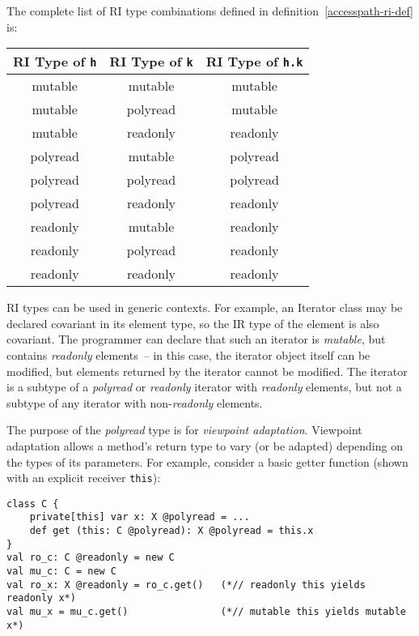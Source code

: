 \documentclass[letterpaper,11pt]{article}
\newcommand{\code}[1]{\lstinline$#1$}
\theoremstyle{definition}
\theoremstyle{remark}
\begin{document}
The complete list of RI type combinations defined in definition~\ref{accesspath-ri-def} is:

\begin{center}
	\begin{tabular}{cc|c}
	RI Type of \code{h} & RI Type of \code{k} & RI Type of \code{h.k} \\
	\hline
	mutable & mutable & mutable \\
	mutable & polyread & mutable \\
	mutable & readonly & readonly \\
	polyread & mutable & polyread \\
	polyread & polyread & polyread \\
	polyread & readonly & readonly \\
	readonly & mutable & readonly \\
	readonly & polyread & readonly \\
	readonly & readonly & readonly \\
	\end{tabular}
\end{center}



RI types can be used in generic contexts. For example,
an Iterator class may be declared covariant in its element type,
so the IR type of the element is also covariant.
The programmer can declare that such an iterator is \emph{mutable}, but
contains \emph{readonly} elements~-- in this case, the iterator object itself
can be modified, but elements returned by the iterator cannot be modified.
The iterator is a subtype of a \emph{polyread} or \emph{readonly} iterator
with \emph{readonly} elements, but not a subtype of any iterator
with non-\emph{readonly} elements.


The purpose of the \emph{polyread} type is for \emph{viewpoint adaptation}.
Viewpoint adaptation allows a method's return type to vary (or be adapted) depending on
the types of its parameters. For example, consider a basic getter function
(shown with an explicit receiver \code{this}):
\begin{lstlisting}
class C {
	private[this] var x: X @polyread = ...
	def get (this: C @polyread): X @polyread = this.x
}
val ro_c: C @readonly = new C
val mu_c: C = new C
val ro_x: X @readonly = ro_c.get()   (*// readonly this yields readonly x*)
val mu_x = mu_c.get()                (*// mutable this yields mutable x*)
\end{lstlisting}
\end{document}
